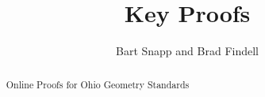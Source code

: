 \documentclass[handout,space,nooutcomes]{xourse}
\title{Key Proofs}
\author{Bart Snapp and Brad Findell}
\begin{document}
\begin{abstract}
Online Proofs for Ohio Geometry Standards
\end{abstract}
\maketitle

{}
\end{document}

